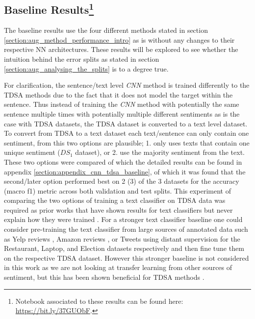 \subsection{Baseline Results\footnote{Notebook associated to these results can be found here: \url{https://bit.ly/37GUObF}.}}
\label{section:aug_baseline}
The baseline results use the four different methods stated in section \ref{section:aug_method_performance_intro} as is without any changes to their respective NN architectures. These results will be explored to see whether the intuition behind the error splits as stated in section \ref{section:aug_analysing_the_splits} is to a degree true. 

For clarification, the sentence/text level \textit{CNN} method is trained differently to the TDSA methods due to the fact that it does not model the target within the sentence. Thus instead of training the \textit{CNN} method with potentially the same sentence multiple times with potentially multiple different sentiments as is the case with TDSA datasets, the TDSA dataset is converted to a text level dataset. To convert from TDSA to a text dataset each text/sentence can only contain one sentiment, from this two options are plausible; 1. only uses texts that contain one unique sentiment ($DS_1$ dataset), or 2. use the majority sentiment from the text. These two options were compared of which the detailed results can be found in appendix \ref{section:appendix_cnn_tdsa_baseline}, of which it was found that the second/later option performed best on 2 (3) of the 3 datasets for the accuracy (macro f1) metric across both validation and test splits. This experiment of comparing the two options of training a text classifier on TDSA data was required as prior works that have shown results for text classifiers but never explain how they were trained \citep{methods_tang-etal-2016-aspect,wang-etal-2016-attention,he-etal-2018-exploiting,jiang-etal-2019-challenge}. For a stronger text classifier baseline one could consider pre-training the text classifier from large sources of annotated data such as Yelp reviews \citep{tang-etal-2015-learning}, Amazon reviews \citep{mcauley2015image,he2016ups}, or Tweets using distant supervision \citep{go2009twitter} for the Restaurant, Laptop, and Election datasets respectively and then fine tune them on the respective TDSA dataset. However this stronger baseline is not considered in this work as we are not looking at transfer learning from other sources of sentiment, but this has been shown beneficial for TDSA methods \citep{he-etal-2018-exploiting}.  

